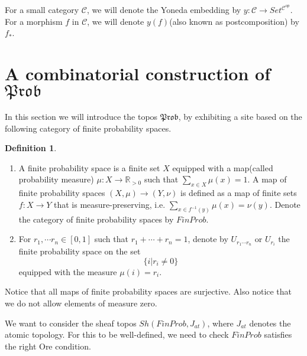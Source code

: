 \documentclass[a4paper]{amsproc}
\theoremstyle{plain}
\theoremstyle{definition}
\newtheorem{definition}[theorem]{Definition}
\theoremstyle{remark}
\numberwithin{equation}{section}
\begin{document}
For a small category $\mathcal{C}$, we will denote the Yoneda embedding by $y: \mathcal{C} \to Set^{\mathcal{C}^{op}}$. For a morphism $f$ in $\mathcal{C}$, we will denote $y(f)$(also known as postcomposition) by $f_*$.

\section{A combinatorial construction of $\mathfrak{Prob}$}

In this section we will introduce the topos $\mathfrak{Prob}$, by exhibiting a site based on the following category of finite probability spaces.

\begin{definition}
\begin{enumerate}
\item A finite probability space is a finite set $X$ equipped with a map(called probability measure) $\mu: X \to \mathbb{R}_{>0}$ such that $\sum_{x \in X} \mu(x) = 1$. A map of finite probability spaces $(X,\mu) \to (Y,\nu)$ is defined as a map of finite sets $f: X \to Y$ that is measure-preserving, i.e. $\sum_{x \in f^{-1}(y)} \mu(x) = \nu(y)$. Denote the category of finite probability spaces by $FinProb$.
\item For $r_1, \cdots r_n \in [0,1]$ such that $r_1 + \cdots + r_n = 1$, denote by $U_{r_1 \cdots r_n}$ or $U_{r_i}$ the finite probability space on the set 
\[
    \{i | r_i \neq 0 \}
\]
equipped with the measure $\mu(i) = r_i$.
\end{enumerate}
\end{definition}

Notice that all maps of finite probability spaces are surjective. Also notice that we do not allow elements of measure zero.

We want to consider the sheaf topos $Sh(FinProb, J_{at})$, where $J_{at}$ denotes the atomic topology. For this to be well-defined, we need to check $FinProb$ satisfies the right Ore condition.
\end{document}
